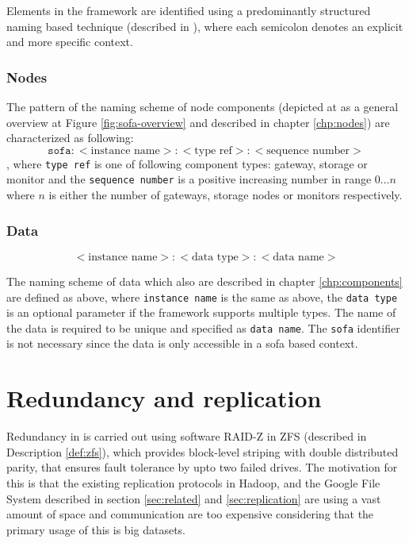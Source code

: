 Elements in the framework are identified using a predominantly structured naming based technique (described in \cite{Tanenbaum:2006:DSP:1202502}), where each semicolon denotes an explicit and more specific context. 

\subsubsection*{Nodes}
The pattern of the naming scheme of node components (depicted at as a general overview at Figure \ref{fig:sofa-overview} and described in chapter \ref{chp:nodes}) are characterized as following:
\begin{equation*}
	\texttt{sofa}:<\text{instance name}>:<\text{type ref}>:<\text{sequence number}>
\end{equation*}
, where \texttt{type ref} is one of following component types: gateway, storage or monitor and the \texttt{sequence number} is a positive increasing number in range $0\ldots n$ where $n$ is either the number of gateways, storage nodes or monitors respectively.

\subsubsection*{Data}
\begin{equation*}
	<\text{instance name}>:<\text{data type}>:<\text{data name}>
\end{equation*}

The naming scheme of data which also are described in chapter \ref{chp:components} are defined as above, where \texttt{instance name} is the same as above, the \texttt{data type} is an optional parameter if the framework supports multiple types. The name of the data is required to be unique and specified as \texttt{data name}. The \texttt{sofa} identifier is not necessary since the data is only accessible in a sofa based context.

\section{Redundancy and replication}
Redundancy in \CodeName is carried out using \eg software RAID-Z in ZFS (described in Description \ref{def:zfs}), which provides block-level striping with double distributed parity, that ensures fault tolerance by upto two failed drives. The motivation for this is that the existing replication protocols in \eg Hadoop, and the Google File System described in section \ref{sec:related} and \ref{sec:replication} are using a vast amount of space and communication are too expensive considering that the primary usage of this is big datasets.
\newline

